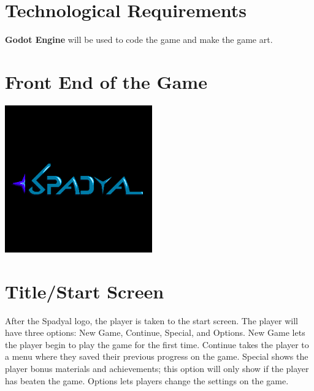 \documentclass[12pt]{article}
\begin{document}
\section{Technological Requirements}
\noindent \textbf{Godot Engine} will be used to code the game and make the game art.
\vfill

\section{Front End of the Game}
\begin{center}
\includegraphics[width=2.5in]{Front_End_Of_The_Game}
\end{center}
\vfill

\section{Title/Start Screen}
\noindent After the Spadyal logo, the player is taken to the start screen. The player will have three options: New Game, Continue, Special, and Options. New Game lets the player begin to play the game for the first time. Continue takes the player to a menu where they saved their previous progress on the game. Special shows the player bonus materials and achievements; this option will only show if the player has beaten the game. Options lets players change the settings on the game.
\newpage
\end{document}
